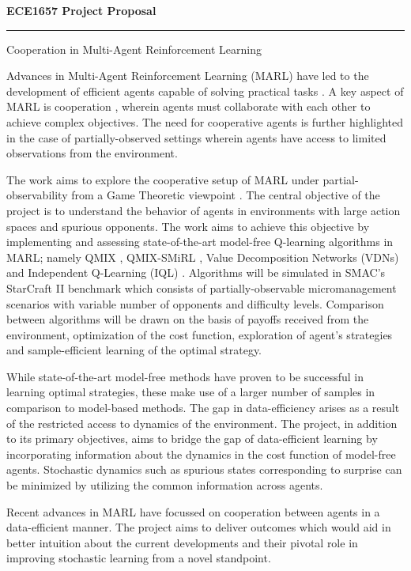 \documentclass[10pt,letterpaper]{article}
\begin{document}
\begin{center}
  \textbf{\large ECE1657 Project Proposal}
\hrule

\end{center}


\begin{center}
  \large{Cooperation in Multi-Agent Reinforcement Learning}
\end{center}

Advances in Multi-Agent Reinforcement Learning (MARL) have led to the development of efficient agents capable of solving practical tasks \cite{overview}. A key aspect of MARL is cooperation \cite{cooperativemarl}, wherein agents must collaborate with each other to achieve complex objectives. The need for cooperative agents is further highlighted in the case of partially-observed settings wherein agents have access to limited observations from the environment.

The work aims to explore the cooperative setup of MARL under partial-observability from a Game Theoretic viewpoint \cite{book,egt}. The central objective of the project is to understand the behavior of agents in environments with large action spaces and spurious opponents. The work aims to achieve this objective by implementing and assessing state-of-the-art model-free Q-learning algorithms \cite{jakob} in MARL; namely QMIX \cite{qmix}, QMIX-SMiRL \cite{smirl}, Value Decomposition Networks (VDNs) \cite{vdn} and Independent Q-Learning (IQL) \cite{iql}. Algorithms will be simulated in SMAC's StarCraft II \cite{smac} benchmark which consists of partially-observable micromanagement scenarios with variable number of opponents and difficulty levels. Comparison between algorithms will be drawn on the basis of payoffs received from the environment, optimization of the cost function, exploration of agent's strategies and sample-efficient learning of the optimal strategy.

While state-of-the-art model-free methods have proven to be successful in learning optimal strategies, these make use of a larger number of samples in comparison to model-based methods. The gap in data-efficiency arises as a result of the restricted access to dynamics of the environment. The project, in addition to its primary objectives, aims to bridge the gap of data-efficient learning by incorporating information about the dynamics in the cost function of model-free agents. Stochastic dynamics such as spurious states corresponding to surprise can be minimized by utilizing the common information across agents. 

Recent advances in MARL have focussed on cooperation between agents in a data-efficient manner. The project aims to deliver outcomes which would aid in better intuition about the current developments and their pivotal role in improving stochastic learning from a novel standpoint. 


\small{}
\end{document}

